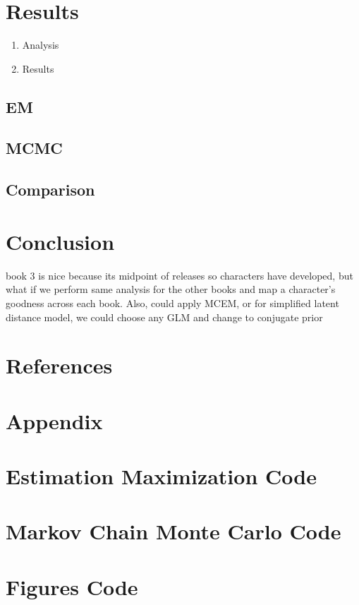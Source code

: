\documentclass{article}
\begin{document}
\section{Results} \label{Results}
\begin{enumerate}
    \item Analysis
    \item Results
\end{enumerate}

\subsection{EM}

\subsection{MCMC}

\subsection{Comparison}

\section{Conclusion} \label{Conclusion}

book 3 is nice because its midpoint of releases so characters have developed, but what if we perform same analysis for the other books and map a character's goodness across each book. Also, could apply MCEM, or for simplified latent distance model, we could choose any GLM and change to conjugate prior

\section{References}
\printbibliography

\section*{Appendix}
\appendix 

\section{Estimation Maximization Code}
\section{Markov Chain Monte Carlo Code}
\section{Figures Code}
\end{document}
